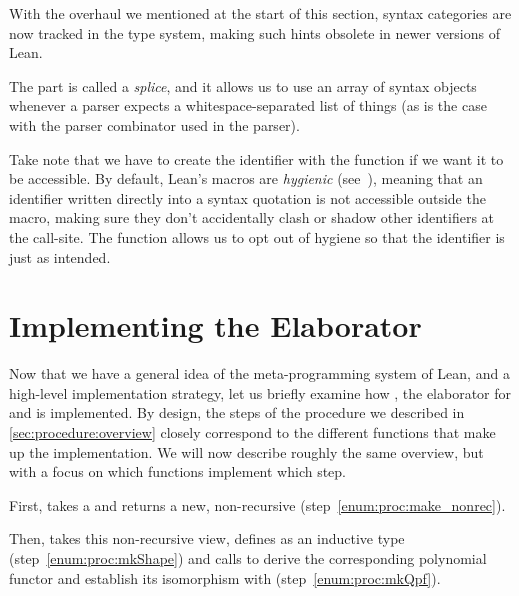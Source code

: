 \begin{remark}
    With the overhaul we mentioned at the start of this section, syntax categories are now tracked in the 
    type system, making such hints obsolete in newer versions of Lean.
\end{remark}

The \lean{\$[...]*} part is called a \emph{splice}, and it allows us to use an array of syntax objects whenever a parser expects a whitespace-separated list of things (as is the case with the  parser combinator used in the \inductive{} parser).

Take note that we have to create the identifier  with the  function if
we want it to be accessible. By default, Lean's macros are \emph{hygienic} (see~\cite{ullrichNotationsHygienicMacro2022}),
meaning that an identifier  written directly into a syntax quotation is not accessible outside the macro, making sure they don't accidentally clash or shadow other identifiers at the call-site.
The  function allows us to opt out of hygiene so that the identifier is just  as intended.






\section{Implementing the Elaborator}%
\label{sec:implementing}

Now that we have a general idea of the meta-programming system of Lean, and a high-level implementation strategy, let us 
briefly examine how , the elaborator for \data{} and \codata{} is implemented.
By design, the steps of the procedure we described in \cref{sec:procedure:overview} closely correspond to the different functions that make up the  implementation.
We will now describe roughly the same overview, but with a focus
on which functions implement which step.

First,  takes a  and returns a new, non-recursive  (step~\ref{enum:proc:make_nonrec}).  

Then,  takes this non-recursive view, defines  as an inductive type (step~\ref{enum:proc:mkShape}) and calls  to derive the corresponding polynomial functor and establish its isomorphism with  (step~\ref{enum:proc:mkQpf}).

